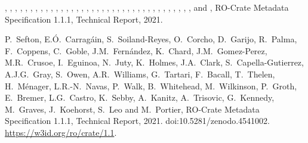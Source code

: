\documentclass[ds,v1.1.2,openaccess]{iosart2x}%
\begin{document}
\begin{thebibliography}{}
%
\begin{botherref}
,
,
,
,
,
,
,
,
,
,
,
,
,
,
,
,
,
,
,
,
,
,
,
,
,
,
,
,
,
,
,
,
,
,
,
,
,
 and
,
{RO}-Crate Metadata Specification 1.1.1,
Technical Report,
2021.
\end{botherref}
%
\OrigBibText
P.~Sefton,
E.{\'{O}}.~Carrag\'{a}in,
S.~Soiland-Reyes,
O.~Corcho,
D.~Garijo,
R.~Palma,
F.~Coppens,
C.~Goble,
J.M.~Fern\'{a}ndez,
K.~Chard,
J.M.~Gomez-Perez,
M.R.~Crusoe,
I.~Eguinoa,
N.~Juty,
K.~Holmes,
J.A.~Clark,
S.~Capella-Gutierrez,
A.J.G.~Gray,
S.~Owen,
A.R.~Williams,
G.~Tartari,
F.~Bacall,
T.~Thelen,
H.~M\'{e}nager,
L.R.-N.~Navas,
P.~Walk,
B.~Whitehead,
M.~Wilkinson,
P.~Groth,
E.~Bremer,
L.G.~Castro,
K.~Sebby,
A.~Kanitz,
A.~Trisovic,
G.~Kennedy,
M.~Graves,
J.~Koehorst,
S.~Leo and
M.~Portier,
{RO}-Crate Metadata Specification 1.1.1,
Technical Report,
2021.
doi:10.5281/zenodo.4541002.
\url{https://w3id.org/ro/crate/1.1}.
\endOrigBibText
{}
\endbibitem


\end{thebibliography}
\end{document}

